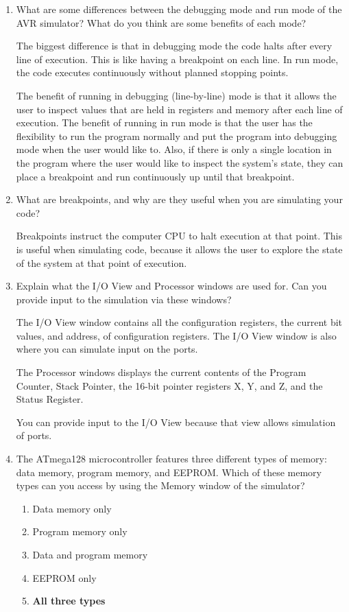 \documentclass[12pt,letterpaper]{article}
\begin{document}
\begin{enumerate}
	\item 
	What are some differences between the debugging mode and run mode of the AVR simulator? 
	What do you think are some benefits of each mode?
	
	The biggest difference is that in debugging mode the code halts after every line of execution.
	This is like having a breakpoint on each line.
	In run mode, the code executes continuously without planned stopping points.
	
	The benefit of running in debugging (line-by-line) mode is that it allows the user to inspect values that are held in registers and memory after each line of execution.
	The benefit of running in run mode is that the user has the flexibility to run the program normally and put the program into debugging mode when the user would like to.
	Also, if there is only a single location in the program where the user would like to inspect the system's state, they can place a breakpoint and run continuously up until that breakpoint.
	
	
	\item 
	What are breakpoints, and why are they useful when you are simulating your code?
	
	Breakpoints instruct the computer CPU to halt execution at that point.
	This is useful when simulating code, because it allows the user to explore the state of the system at that point of execution.
	
	
	\item 
	Explain what the I/O View and Processor windows are used for. 
	Can you provide input to the simulation via these windows?
	 
	The I/O View window contains all the configuration registers, the current bit values, and address, of configuration registers.
	The I/O View window is also where you can simulate input on the ports.
	
	The Processor windows displays the current contents of the Program Counter,
	Stack Pointer, the 16-bit pointer registers X, Y, and Z, and the Status Register.
	
	You can provide input to the I/O View because that view allows simulation of ports.
	 
	 
	 \item 
	 The ATmega128 microcontroller features three different types of memory:
	 data memory, program memory, and EEPROM. 
	 Which of these memory types can you access by using the Memory window of the simulator?
	 
	 \begin{enumerate}[a]
	 	\item 
	 	Data memory only
	 	
	 	\item 
	 	Program memory only
	 	
	 	\item 
	 	Data and program memory
	 	
	 	\item 
	 	EEPROM only
	 	
	 	\item 
	 	\textbf{All three types}
	 \end{enumerate}
\end{enumerate}
\end{document}

